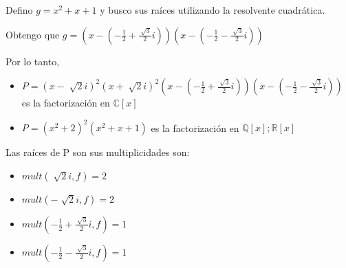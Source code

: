 Defino $ g = x^2 + x + 1 $ y busco sus raíces utilizando la resolvente cuadrática.

Obtengo que $ g = (x-(-\frac{1}{2} + \frac{\sqrt[]{3}}{2}i))(x-(-\frac{1}{2} - \frac{\sqrt[]{3}}{2}i)) $

Por lo tanto,
\begin{itemize}
    \item $ P = (x-\sqrt[]{2}i)^2(x+\sqrt[]{2}i)^2(x-(-\frac{1}{2} + \frac{\sqrt[]{3}}{2}i))(x-(-\frac{1}{2} - \frac{\sqrt[]{3}}{2}i)) $ es la factorización en $ \mathbb{C}[x] $
    \item $ P = (x^2 + 2)^2(x^2 + x + 1) $ es la factorización en $ \mathbb{Q}[x]; \mathbb{R}[x] $
\end{itemize}

Las raíces de P son sus multiplicidades son:
\begin{itemize}
    \item $ mult(\sqrt[]{2}i, f) = 2 $
    \item $ mult(-\sqrt[]{2}i, f) = 2 $
    \item $ mult(-\frac{1}{2} + \frac{\sqrt[]{3}}{2}i, f) = 1 $
    \item $ mult(-\frac{1}{2} - \frac{\sqrt[]{3}}{2}i, f) = 1 $
\end{itemize}



